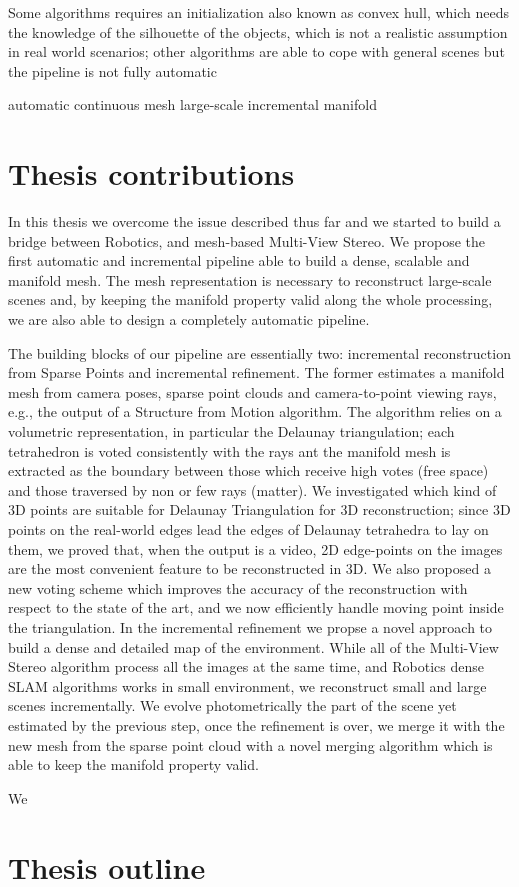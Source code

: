 Some algorithms requires an initialization also known as convex hull, which needs the knowledge of the silhouette of the objects, which  is not a realistic assumption in real world scenarios; other algorithms are able to cope with general scenes but the pipeline is not fully automatic






automatic
continuous mesh
large-scale
incremental
manifold





\section{Thesis contributions}
In this thesis we overcome the issue described thus far and we started to build a bridge between Robotics, and mesh-based Multi-View Stereo.
We propose the first automatic and incremental pipeline able to build a dense, scalable and manifold mesh.
The mesh representation is necessary to reconstruct  large-scale scenes and, by keeping the manifold property valid along the whole processing, we are also able to design a completely automatic pipeline.

The building blocks of our pipeline are essentially two: incremental reconstruction from Sparse Points and incremental refinement.
The former estimates a  manifold mesh from camera poses, sparse point clouds and camera-to-point viewing rays, e.g., the output of a Structure from Motion algorithm.
The algorithm relies on a volumetric representation, in particular the Delaunay triangulation; each tetrahedron is voted consistently with the rays ant the manifold mesh is extracted as the boundary between those which receive high votes (free space) and those traversed by non or few rays (matter).
We investigated which kind of 3D points are suitable for Delaunay Triangulation for 3D reconstruction; since 3D points on the real-world edges lead the edges of Delaunay tetrahedra to lay on them, we proved that, when the output is a video, 2D edge-points on the images are the most convenient feature to be reconstructed in 3D.
We also proposed a new voting scheme which improves the accuracy of the reconstruction with respect to the state of the art, and we now efficiently handle moving point inside the triangulation.
In the incremental refinement we propse a novel approach to build a dense and detailed map of the environment.
While all of the Multi-View Stereo algorithm process all the images  at the same time, and Robotics dense SLAM algorithms works in small environment, we reconstruct small and large scenes incrementally. 
We evolve photometrically the part of the scene yet estimated by the previous step, once the refinement is over, we merge it with the new mesh from the sparse point cloud with a novel merging algorithm which is able to keep the manifold property valid.


We 






\section{Thesis outline}










